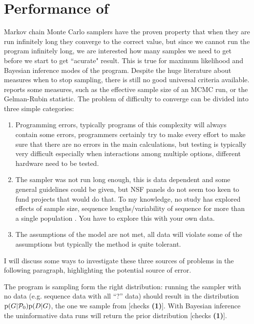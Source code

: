 \chapter{Performance of  \migrate}

Markov chain Monte Carlo samplers have the proven property that when they are run infinitely long they converge to the correct value, but since we cannot run the program infinitely long, we are interested how many samples we need to get before we start to get ``acurate" result.  This is true for maximum likelihood and Bayesian inference modes of the program.
Despite the huge literature about measures when to stop sampling, there
is still no good universal criteria available. \migrate reports some measures, such as the effective sample size of an MCMC run, or the Gelman-Rubin statistic. The problem of difficulty to converge can be divided into three simple categories: 
\begin{enumerate}
\item Programming errors, typically programs of this complexity will always contain some errors, programmers certainly try to make every effort to make sure that there are no errors in the main calculations, but testing is typically very difficult especially when interactions among multiple options, different hardware need to be tested. 
\item The sampler was not run long enough, this is data dependent and some general guidelines could be given, 
but NSF panels do not seem too keen to fund projects that would do that. To my knowledge, no study has explored effects of sample size, sequence lengths/variability of sequence for more than a single population \citep{Pluzhnikov:1996, Felsenstein:2005, Carling:2007}. You have to explore this with your own data.
\item The assumptions of the model are not met, all data will violate some of the assumptions but typically the method is quite tolerant.
\end{enumerate}
I will discuss some ways to investigate these three sources of problems in the following paragraph, highlighting the potential source of error.

The program is sampling form the right distribution: 
running the sampler with no data (e.g. sequence data with all ``?'' data)
should result
in the distribution ${\mathrm p}(G|\mathcal{P}_0){\mathrm p}(D|G)$, the one 
we sample from [checks \textbf{ (1)}]. With Bayesian inference the uninformative data runs will return the prior distribution [checks \textbf{ (1)}]. 

